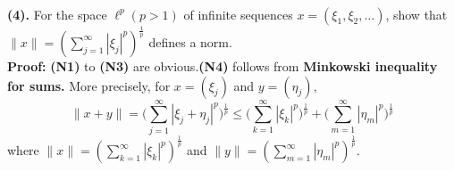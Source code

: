 \documentclass{homework}
\begin{document}
\\
\textbf{(4). }For the space $\ell^p(p>1)$ of infinite sequences $x=\left(\xi_1, \xi_2, \ldots\right)$, show that $\|x\|=\left(\sum_{j=1}^{\infty}\left|\xi_j\right|^p\right)^{\frac{1}{p}}$ defines a norm.
\\
\textbf{Proof: } 
\textbf{(N1)} to \textbf{(N3)} are obvious.\textbf{(N4)} follows from \textbf{Minkowski inequality for sums.} More precisely, for $x =(\xi_j)$ and $y=(\eta_j)$,
$$
\|x+y\|=\Bigg(\sum_{j=1}^{\infty}|\xi_j+\eta_j|^p\Bigg)^\frac{1}{p}
\leq
\Bigg(\sum_{k=1}^{\infty}|\xi_k|^p\Bigg)^\frac{1}{p} + \Bigg(\sum_{m=1}^{\infty}|\eta_m|^p\Bigg)^\frac{1}{p}
$$
where $ \|x\| = \left(\sum_{k=1}^{\infty}|\xi_k|^p\right)^\frac{1}{p}$ and $ \|y\| = \left(\sum_{m=1}^{\infty}|\eta_m|^p\right)^\frac{1}{p}$.
\\
\\
\end{document}

